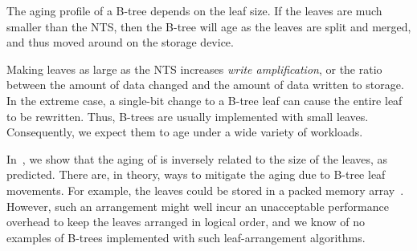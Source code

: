The aging profile of a B-tree depends on the leaf size.  If the
leaves are much smaller than the NTS, then the
B-tree will age as the leaves are split and merged, and thus moved
around on the storage device.

Making leaves as large as the  NTS increases 
\emph{write amplification}, or the ratio between the
amount of data changed and the amount of data written to storage.  In the extreme
case, a single-bit change to a B-tree leaf can cause the entire leaf
to be rewritten.  Thus, B-trees are usually implemented with small
leaves.  Consequently, we expect them to age under a wide variety of
workloads.

In~, we show that the aging of \btrfs is inversely
related to the size of the leaves, as predicted.  There are, in
theory, ways to mitigate the aging due to B-tree leaf movements.  For
example, the leaves could be stored in a packed memory
array~\cite{BenderDeFa05}.  However, such an arrangement might well
incur an unacceptable performance overhead to keep the leaves arranged
in logical order, and we know of no examples of B-trees implemented
with such leaf-arrangement algorithms.

\iffalse
When using blocks of NTS, small updates
may cause very large reads and rewrites.
In general, this creates a trade-off between read and write performance,
which we demonstrate empirically in the \btrfs file system
by varying the node size (\secref{btrfs_node}).

\fi


\iffalse
\tightpara{Packed Memory Arrays.}
Another way to prevent large block sizes from leading to excessive
write-amplification is to strategically leave spaces between the data inside
each block. This allows for small writes, updates and deletions to occur within
those spaces. By dynamically maintaining this structure, the data can be kept
relatively sequentially and with room for small modifications. This is the
basic principle behind the Packed Memory Array (PMA)~\cite{BenderDeFa05},
a data structure
which provides strong guarantees as to both the write-amplification incurred
and the sequentiality of the data in the block.
\fi

